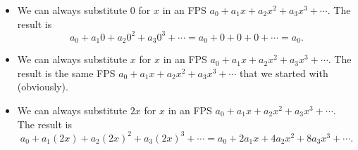 \begin{itemize}
\item We can always substitute $0$ for $x$ in an FPS $a_{0}+a_{1}x+a_{2}%
x^{2}+a_{3}x^{3}+\cdots$. The result is%
\[
a_{0}+a_{1}0+a_{2}0^{2}+a_{3}0^{3}+\cdots=a_{0}+0+0+0+\cdots=a_{0}.
\]


\item We can always substitute $x$ for $x$ in an FPS $a_{0}+a_{1}x+a_{2}%
x^{2}+a_{3}x^{3}+\cdots$. The result is the same FPS $a_{0}+a_{1}x+a_{2}%
x^{2}+a_{3}x^{3}+\cdots$ that we started with (obviously).

\item We can always substitute $2x$ for $x$ in an FPS $a_{0}+a_{1}x+a_{2}%
x^{2}+a_{3}x^{3}+\cdots$. The result is%
\[
a_{0}+a_{1}\left(  2x\right)  +a_{2}\left(  2x\right)  ^{2}+a_{3}\left(
2x\right)  ^{3}+\cdots=a_{0}+2a_{1}x+4a_{2}x^{2}+8a_{3}x^{3}+\cdots.
\]



\end{itemize}
